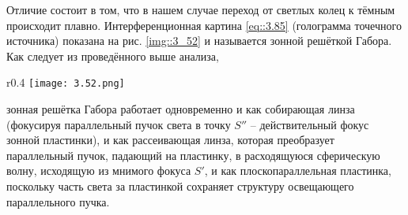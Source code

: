 Отличие состоит в том, что в нашем случае переход от светлых колец к тёмным происходит плавно. 
Интерференционная картина \eqref{eq::3.85} (голограмма точечного источника) показана на
рис. \ref{img::3_52} и называется зонной решёткой Габора. Как следует из проведённого выше анализа, 
\newpage
\begin{wrapfigure}{r}{0.4\linewidth}
    \texttt{[image: 3.52.png]}
    \caption{Зависимость $I(\rho)$}
    \label{img::3_52}
\end{wrapfigure}
зонная решётка Габора работает одновременно и как собирающая линза (фокусируя параллельный пучок 
света в точку $S''$ -- действительный фокус зонной пластинки), и как рассеивающая линза, которая 
преобразует параллельный пучок, падающий на пластинку, в расходящуюся сферическую волну, исходящую из
мнимого фокуса $S'$, и как плоскопараллельная пластинка, поскольку часть света за пластинкой 
сохраняет структуру освещающего параллельного пучка.